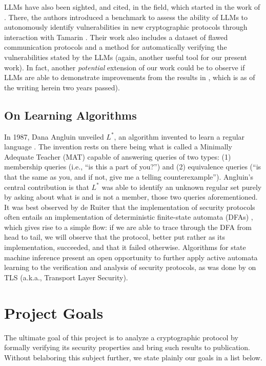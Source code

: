 \documentclass[11pt]{article}
\begin{document}
LLMs have also been sighted, and cited, in the field, which started in the work of \cite{curaba2024cryptoformalevalintegratingllmsformal}. There, the authors introduced a benchmark to assess the ability of LLMs to autonomously identify vulnerabilities in new cryptographic protocols through interaction with Tamarin \cite{curaba2024cryptoformalevalintegratingllmsformal}. Their work also includes a dataset of flawed communication protocols and a method for automatically verifying the vulnerabilities stated by the LLMs (again, another useful tool for our present work). In fact, another \textit{potential} extension of our work could be to observe if LLMs are able to demonstrate improvements from the results in \cite{curaba2024cryptoformalevalintegratingllmsformal}, which is as of the writing herein two years passed). 


\subsection{On Learning Algorithms}
\label{sec:learnalgo}
In 1987, Dana Angluin unveiled $L^*$, an algorithm invented to learn a regular language \cite{angluin1987}. The invention rests on there being what is called a Minimally Adequate Teacher (MAT) capable of answering queries of two types: (1) membership queries (i.e., ``is this a part of you?'') and (2) equivalence queries (``is that the same as you, and if not, give me a telling counterexample''). Angluin's central contribution is that $L^*$ was able to identify an unknown regular set purely by asking about what is and is not a member, those two queries aforementioned.
	It was best observed by de Ruiter that the implementation of security protocols often entails an implementation of deterministic finite-state automata (DFAs) \cite{deruiter2015}, which gives rise to a simple flow: if we are able to trace through the DFA from head to tail, we will observe that the protocol, better put rather as its implementation, succeeded, and that it failed otherwise. Algorithms for state machine inference present an open opportunity to further apply active automata learning to the verification and analysis of security protocols, as was done by \cite{deruiter2015} on TLS (a.k.a., Transport Layer Security).


 
\section{Project Goals}
The ultimate goal of this project is to analyze a cryptographic protocol by formally verifying its security properties and bring such results to publication. Without belaboring this subject further, we state plainly our goals in a list below. 
\end{document}
